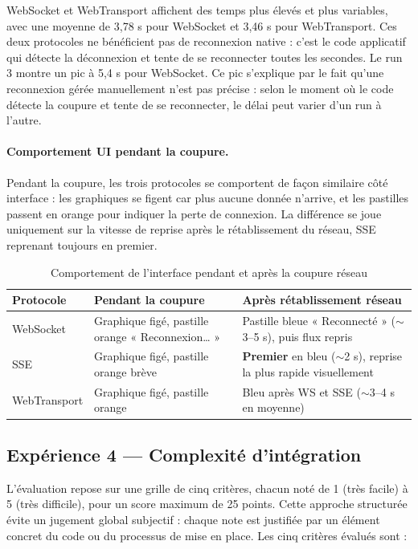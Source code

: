 WebSocket et WebTransport affichent des temps plus élevés et plus variables, avec une moyenne de 3,78 s pour WebSocket et 3,46 s pour WebTransport. Ces deux protocoles ne bénéficient pas de reconnexion native : c'est le code applicatif qui détecte la déconnexion et tente de se reconnecter toutes les secondes. Le run 3 montre un pic à 5,4 s pour WebSocket. Ce pic s'explique par le fait qu'une reconnexion gérée manuellement n'est pas précise : selon le moment où le code détecte la coupure et tente de se reconnecter, le délai peut varier d'un run à l'autre.

\paragraph{Comportement UI pendant la coupure.}
Pendant la coupure, les trois protocoles se comportent de façon similaire côté interface : les graphiques se figent car plus aucune donnée n'arrive, et les pastilles passent en orange pour indiquer la perte de connexion. La différence se joue uniquement sur la vitesse de reprise après le rétablissement du réseau, SSE reprenant toujours en premier.

\begin{table}[H]
\centering
\small
\begin{tabular}{|l|p{4.5cm}|p{5cm}|}
\hline
\textbf{Protocole} & \textbf{Pendant la coupure} & \textbf{Après rétablissement réseau} \\
\hline
WebSocket & Graphique figé, pastille orange « Reconnexion… » & Pastille bleue « Reconnecté » ($\sim$3--5 s), puis flux repris \\
\hline
SSE & Graphique figé, pastille orange brève & \textbf{Premier} en bleu ($\sim$2 s), reprise la plus rapide visuellement \\
\hline
WebTransport & Graphique figé, pastille orange & Bleu après WS et SSE ($\sim$3--4 s en moyenne) \\
\hline
\end{tabular}
\caption{Comportement de l'interface pendant et après la coupure réseau}
\end{table}

\subsection{Expérience 4 --- Complexité d'intégration}

L'évaluation repose sur une grille de cinq critères, chacun noté de 1 (très facile) à 5 (très difficile), pour un score maximum de 25 points. Cette approche structurée évite un jugement global subjectif : chaque note est justifiée par un élément concret du code ou du processus de mise en place. Les cinq critères évalués sont :

